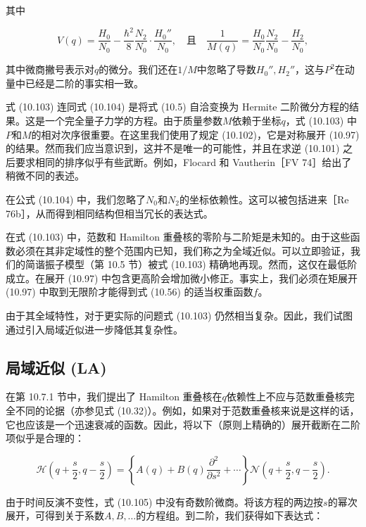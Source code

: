 其中

\begin{equation}
V(q)=\frac{H_{0}}{N_{0}}-\frac{\hbar^{2}}{8}\frac{N_{2}}{N_{0}}\cdot\frac{H_{0}''}{N_{0}},\quad\text{且}\quad\frac{1}{M(q)}=\frac{H_{0}}{N_{0}}\frac{N_{2}}{N_{0}}-\frac{H_{2}}{N_{0}},\label{eq:10.104}
\end{equation}

其中微商撇号表示对$q$的微分。我们还在$1/M$中忽略了导数$H_{0}'',H_{2}''$，这与$P^{2}$在动量中已经是二阶的事实相一致。

式 (10.103) 连同式 (10.104) 是将式 (10.5) 自洽变换为 Hermite 二阶微分方程的结果。这是一个完全量子力学的方程。由于质量参数$M$依赖于坐标$q$，式
(10.103) 中$P$和$M$的相对次序很重要。在这里我们使用了规定 (10.102)，它是对称展开 (10.97) 的结果。然而我们应当意识到，这并不是唯一的可能性，并且在求逆
(10.101) 之后要求相同的排序似乎有些武断。例如，Flocard 和 Vautherin［FV 74］给出了稍微不同的表述。

在公式 (10.104) 中，我们忽略了$N_{0}$和$N_{2}$的坐标依赖性。这可以被包括进来［Re 76b］，从而得到相同结构但相当冗长的表达式。

在式 (10.103) 中，范数和 Hamilton 重叠核的零阶与二阶矩是未知的。由于这些函数必须在其非定域性的整个范围内已知，我们称之为全域近似。可以立即验证，我们的简谐振子模型（第
10.5 节）被式 (10.103) 精确地再现。然而，这仅在最低阶成立。在展开 (10.97) 中包含更高阶会增加微小修正。事实上，我们必须在矩展开
(10.97) 中取到无限阶才能得到式 (10.56) 的适当权重函数$f$。

由于其全域特性，对于更实际的问题式 (10.103) 仍然相当复杂。因此，我们试图通过引入局域近似进一步降低其复杂性。

\subsection{局域近似 (LA)}

在第 10.7.1 节中，我们提出了 Hamilton 重叠核在$q$依赖性上不应与范数重叠核完全不同的论据（亦参见式 (10.32)）。例如，如果对于范数重叠核来说是这样的话，它也应该是一个迅速衰减的函数。因此，将以下（原则上精确的）展开截断在二阶项似乎是合理的：

\begin{equation}
\mathscr{H}\left(q+\frac{s}{2},q-\frac{s}{2}\right)=\left\{ A(q)+B(q)\frac{\partial^{2}}{\partial s^{2}}+\cdots\right\} \mathscr{N}\left(q+\frac{s}{2},q-\frac{s}{2}\right).\label{eq:10.105}
\end{equation}

由于时间反演不变性，式 (10.105) 中没有奇数阶微商。将该方程的两边按$s$的幂次展开，可得到关于系数$A,B,\dots$的方程组。到二阶，我们获得如下表达式：

